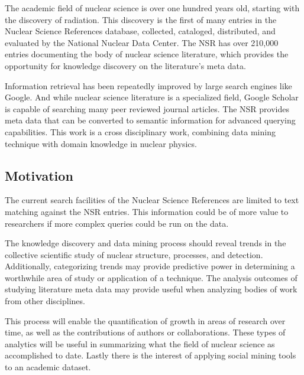 \documentclass[12pt]{article}
\begin{document}
\begin{doublespacing}
The academic field of nuclear science is over one hundred years old, starting with the discovery of radiation.
This discovery is the first of many entries in the Nuclear Science References database, collected, cataloged, distributed, and evaluated by the National Nuclear Data Center. \citep{Kurgan200603} 
The NSR has over 210,000 entries documenting the body of nuclear science literature, which provides the opportunity for knowledge discovery on the literature's meta data.

Information retrieval has been repeatedly improved by large search engines like Google.
And while nuclear science literature is a specialized field, Google Scholar is capable of searching many peer reviewed journal articles.
The NSR provides meta data that can be converted to semantic information for advanced querying capabilities.
This work is a cross disciplinary work, combining data mining technique with domain knowledge in nuclear physics. 

\subsection{Motivation}
The current search facilities of the Nuclear Science References are limited to text matching against the NSR entries.
This information could be of more value to researchers if more complex queries could be run on the data.

The knowledge discovery and data mining process should reveal trends in the collective scientific study of nuclear structure, processes, and detection.
Additionally, categorizing trends may provide predictive power in determining a worthwhile area of study or application of a technique.
The analysis outcomes of studying literature meta data may provide useful when analyzing bodies of work from other disciplines.

This process will enable the quantification of growth in areas of research over time, as well as the contributions of authors or collaborations.
These types of analytics will be useful in summarizing what the field of nuclear science as accomplished to date.
Lastly there is the interest of applying social mining tools to an academic dataset.



\end{doublespacing}
\end{document}
